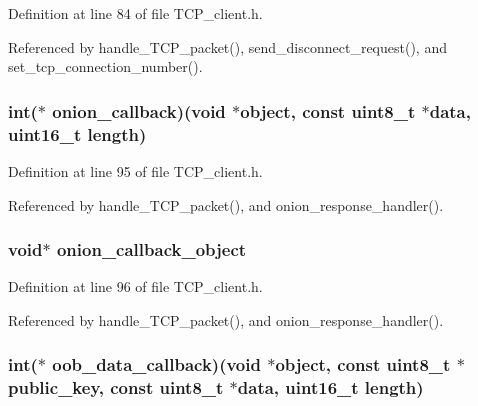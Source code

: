 Definition at line 84 of file T\+C\+P\+\_\+client.\+h.



Referenced by handle\+\_\+\+T\+C\+P\+\_\+packet(), send\+\_\+disconnect\+\_\+request(), and set\+\_\+tcp\+\_\+connection\+\_\+number().

\hypertarget{struct_t_c_p___client___connection_ab6dd4883cc217ef4c036cb404f036a47}{
\subsubsection[{onion\+\_\+callback}]{\setlength{\rightskip}{0pt plus 5cm}int($\ast$ onion\+\_\+callback)(void $\ast$object, const uint8\+\_\+t $\ast$data, uint16\+\_\+t length)}}\label{struct_t_c_p___client___connection_ab6dd4883cc217ef4c036cb404f036a47}


Definition at line 95 of file T\+C\+P\+\_\+client.\+h.



Referenced by handle\+\_\+\+T\+C\+P\+\_\+packet(), and onion\+\_\+response\+\_\+handler().

\hypertarget{struct_t_c_p___client___connection_a975f7347f9eee77bcd1eb36b5e913021}{
\subsubsection[{onion\+\_\+callback\+\_\+object}]{\setlength{\rightskip}{0pt plus 5cm}void$\ast$ onion\+\_\+callback\+\_\+object}}\label{struct_t_c_p___client___connection_a975f7347f9eee77bcd1eb36b5e913021}


Definition at line 96 of file T\+C\+P\+\_\+client.\+h.



Referenced by handle\+\_\+\+T\+C\+P\+\_\+packet(), and onion\+\_\+response\+\_\+handler().

\hypertarget{struct_t_c_p___client___connection_a3f8394ec4439b5730e80f10d6951b845}{
\subsubsection[{oob\+\_\+data\+\_\+callback}]{\setlength{\rightskip}{0pt plus 5cm}int($\ast$ oob\+\_\+data\+\_\+callback)(void $\ast$object, const uint8\+\_\+t $\ast${\bf public\+\_\+key}, const uint8\+\_\+t $\ast$data, uint16\+\_\+t length)}}\label{struct_t_c_p___client___connection_a3f8394ec4439b5730e80f10d6951b845}


